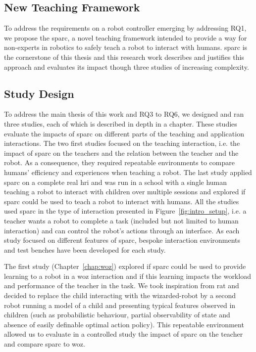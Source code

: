 \subsection{New Teaching Framework}
To address the requirements on a robot controller emerging by addressing RQ1, we propose the \gls{sparc}, a novel teaching framework intended to provide a way for non-experts in robotics to safely teach a robot to interact with humans. \gls{sparc} is the cornerstone of this thesis and this research work describes and justifies this approach and evaluates its impact though three studies of increasing complexity.

\subsection{Study Design} 

To address the main thesis of this work and RQ3 to RQ6, we designed and ran three studies, each of which is described in depth in a chapter. These studies evaluate the impacts of \gls{sparc} on different parts of the teaching and application interactions. The two first studies focused on the teaching interaction, i.e. the impact of \gls{sparc} on the teachers and the relation between the teacher and the robot. As a consequence, they required repeatable environments to compare humans' efficiency and experiences when teaching a robot. The last study applied \gls{sparc} on a complete real \gls{hri} and was run in a school with a single human teaching a robot to interact with children over multiple sessions and explored if \gls{sparc} could be used to teach a robot to interact with humans. All the studies used \gls{sparc} in the type of interaction presented in Figure~\ref{fig:intro_setup}, i.e. a teacher wants a robot to complete a task (included but not limited to human interaction) and can control the robot's actions through an interface. As each study focused on different features of \gls{sparc}, bespoke interaction environments and test benches have been developed for each study.

The first study (Chapter~\ref{chap:woz}) explored if \gls{sparc} could be used to provide learning to a robot in a \gls{woz} interaction and if this learning impacts the workload and performance of the teacher in the task. We took inspiration from \gls{rat} and decided to replace the child interacting with the wizarded-robot by a second robot running a model of a child and presenting typical features observed in children (such as probabilistic behaviour, partial observability of state and absence of easily definable optimal action policy). This repeatable environment allowed us to evaluate in a controlled study the impact of \gls{sparc} on the teacher and compare \gls{sparc} to \gls{woz}.

